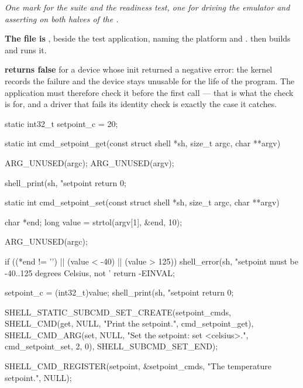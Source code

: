 \noindent{}

\noindent\emph{One mark for the suite and the readiness test, one for driving the emulator and
asserting on both halves of the .}

\textbf{The file is }, beside the test application, naming the platform and
.  then builds and runs it.

\textbf{ returns false} for a device whose init returned a negative error:
the kernel records the failure and the device stays unusable for the life of the program. The
application must therefore check it before the first call --- that is what the check is for, and a
driver that fails its identity check is exactly the case it catches. 



\begin{ccode}
static int32_t setpoint_c = 20;

static int cmd_setpoint_get(const struct shell *sh, size_t argc, char **argv)
{
	ARG_UNUSED(argc);
	ARG_UNUSED(argv);

	shell_print(sh, "setpoint %
	return 0;
}

static int cmd_setpoint_set(const struct shell *sh, size_t argc, char **argv)
{
	char *end;
	long value = strtol(argv[1], &end, 10);

	ARG_UNUSED(argc);

	if ((*end != '\0') || (value < -40) || (value > 125)) {
		shell_error(sh, "setpoint must be -40..125 degrees Celsius, not '%
		return -EINVAL;
	}

	setpoint_c = (int32_t)value;
	shell_print(sh, "setpoint %
	return 0;
}

SHELL_STATIC_SUBCMD_SET_CREATE(setpoint_cmds,
			       SHELL_CMD(get, NULL, "Print the setpoint.", cmd_setpoint_get),
			       SHELL_CMD_ARG(set, NULL, "Set the setpoint: set <celsius>.",
					     cmd_setpoint_set, 2, 0),
			       SHELL_SUBCMD_SET_END);

SHELL_CMD_REGISTER(setpoint, &setpoint_cmds, "The temperature setpoint.", NULL);
\end{ccode}

\noindent{}

